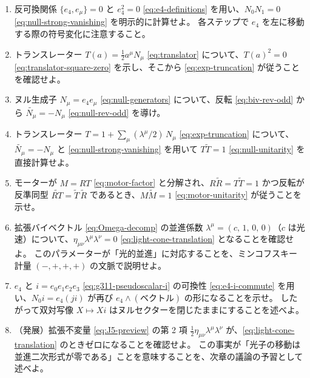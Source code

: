 \documentclass[dvipdfmx,a4paper,oneside]{jsbook}
\numberwithin{equation}{chapter}
\begin{document}
\begin{enumerate}[leftmargin=2em]
  \item 反可換関係 \(\{e_4, e_\mu\} = 0\) と \(e_4^2 = 0\) \eqref{eq:e4-definitions} を用い、\(N_0 N_1 = 0\) \eqref{eq:null-strong-vanishing} を明示的に計算せよ。
  各ステップで \(e_4\) を左に移動する際の符号変化に注意すること。

  \item トランスレーター \(T(a) = \tfrac{1}{2} a^\mu N_\mu\) \eqref{eq:translator} について、\(T(a)^2 = 0\) \eqref{eq:translator-square-zero} を示し、そこから \eqref{eq:exp-truncation} が従うことを確認せよ。

  \item ヌル生成子 \(N_\mu = e_4 e_\mu\) \eqref{eq:null-generators} について、反転 \eqref{eq:biv-rev-odd} から \(\widetilde{N_\mu} = -N_\mu\) \eqref{eq:null-rev-odd} を導け。

  \item トランスレーター \(T = 1 + \sum_\mu (\lambda^\mu/2)\, N_\mu\) \eqref{eq:exp-truncation} について、\(\widetilde{N_\mu} = -N_\mu\) と \eqref{eq:null-strong-vanishing} を用いて \(T\widetilde{T} = 1\) \eqref{eq:null-unitarity} を直接計算せよ。

  \item モーターが \(M = RT\) \eqref{eq:motor-factor} と分解され、\(R\widetilde{R} = T\widetilde{T} = 1\) かつ反転が反準同型 \(\widetilde{RT} = \widetilde{T}\,\widetilde{R}\) であるとき、\(M\widetilde{M} = 1\) \eqref{eq:motor-unitarity} が従うことを示せ。

  \item 拡張バイベクトル \eqref{eq:Omega-decomp} の並進係数 \(\lambda^\mu = (c,\, 1,\, 0,\, 0)\)（\(c\) は光速）について、\(\eta_{\mu\nu}\lambda^\mu\lambda^\nu = 0\) \eqref{eq:light-cone-translation} となることを確認せよ。
  このパラメーターが「光的並進」に対応することを、ミンコフスキー計量 \((-,+,+,+)\) の文脈で説明せよ。

  \item \(e_4\) と \(i = e_0 e_1 e_2 e_3\) \eqref{eq:g311-pseudoscalar-i} の可換性 \eqref{eq:e4-i-commute} を用い、\(N_0 i = e_4 (j i)\) が再び \(e_4 \wedge (\text{ベクトル})\) の形になることを示せ。
  したがって双対写像 \(X \mapsto Xi\) はヌルセクターを閉じたままにすることを述べよ。

  \item （発展）拡張不変量 \eqref{eq:J5-preview} の第 2 項 \(\tfrac{1}{2}\eta_{\mu\nu}\lambda^\mu\lambda^\nu\) が、\eqref{eq:light-cone-translation} のときゼロになることを確認せよ。
  この事実が「光子の移動は並進二次形式が零である」ことを意味することを、次章の議論の予習として述べよ。
\end{enumerate}
\end{document}
